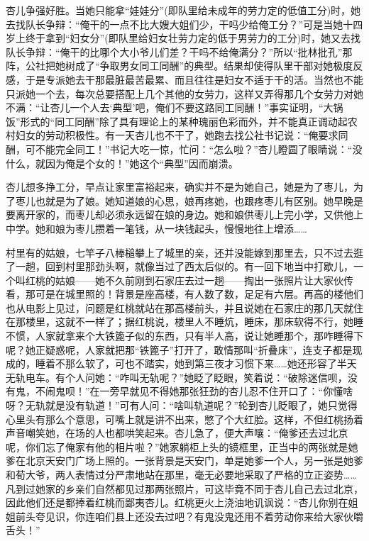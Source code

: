 \par 杏儿争强好胜。当她只能拿“娃娃分”(即队里给未成年的劳力定的低值工分)时，她去找队长争辩：“俺干的一点不比大嫂大姐们少，干吗少给俺工分？”可是当她十四岁上终于拿到“妇女分”(即队里给妇女壮劳力定的低于男劳力的工分)时，她又去找队长争辩：“俺干的比哪个大小爷儿们差？干吗不给俺满分？”所以“批林批孔”那阵，公社把她树成了“争取男女同工同酬”的典型。结果却使得队里干部对她极度反感，于是专派她去干那最脏最苦最累、而且往往是妇女不适于干的活。当然也不能只派她一个去，每次总要搭配上几个其他的女劳力，这样又弄得那几个女劳力对她不满：“让杏儿一个人去‘典型’吧，俺们不要这路同工同酬！”事实证明，“大锅饭”形式的“同工同酬”除了具有理论上的某种瑰丽色彩而外，并不能真正调动起农村妇女的劳动积极性。有一天杏儿也不干了，她跑去找公社书记说：“俺要求同酬，可不能完全同工！”书记大吃一惊，忙问：“怎么啦？”杏儿瞪圆了眼睛说：“没什么，就因为俺是个女的！”她这个“典型”因而崩溃。
\par 杏儿想多挣工分，早点让家里富裕起来，确实并不是为她自己，她是为了枣儿，为了枣儿也就是为了娘。她知道娘的心思，娘再疼她，也跟疼枣儿有区别。她早晚是要离开家的，而枣儿却必须永远留在娘的身边。她和娘供枣儿上完小学，又供他上中学。她和娘为枣儿攒着一笔钱，从一块钱起头，慢慢地往上增添……
\par 村里有的姑娘，七竿子八棒槌攀上了城里的亲，还并没能嫁到那里去，只不过去逛了一趟，回到村里那劲头啊，就像当过了西太后似的。有一回下地当中打歇儿，一个叫红桃的姑娘——她不久前刚到石家庄去过一趟——掏出一张照片让大家伙传看，那可是在城里照的！背景是座高楼，有人数了数，足足有六层。再高的楼他们也从电影上见过，问题是红桃就站在那高楼前头，并且说她在石家庄的那几天就住在那楼里，这就不一样了；据红桃说，楼里人不睡炕，睡床，那床软得不行，她睡不惯，人家就拿来个大铁篦子似的东西，只有半人高，说让她睡那个，那咋睡得下呢？她正疑惑呢，人家就把那“铁篦子”打开了，敢情那叫“折叠床”，连支子都是现成的，睡着不那么软了，可也不踏实，她到第三夜才习惯下来……她还形容了半天无轨电车。有个人问她：“咋叫无轨呢？”她眨了眨眼，笑着说：“破除迷信呗，没有鬼，不闹鬼呗！”在一旁早就见不得她那张狂劲的杏儿忍不住开口了：“你懂啥呀？无轨就是没有轨道！”可有人问：“啥叫轨道呢？”轮到杏儿眨眼了，她只觉得心里头有那么个意思，可嘴上就是讲不出来，憋了个大红脸。这样，不但红桃扬着声音嘲笑她，在场的人也都哄笑起来。杏儿急了，便大声嚷：“俺爹还去过北京呢，你们忘了俺家有他的相片啦？”她家躺柜上头的镜框里，正当中的两张就是她爹在北京天安门广场上照的。一张背景是天安门，单是她爹一个人，另一张是她爹和荀大爷，两人表情过分严肃地站在那里，毫无必要地采取了严格的立正姿势……凡到过她家的乡亲们自然都见过那两张照片，可这毕竟不同于杏儿自己去过北京，因此他们还是都捧着红桃而鄙夷杏儿。红桃更火上浇油地讥讽说：“杏儿你别在姐姐前头夸见识，你连咱们县上还没去过吧？有鬼没鬼还用不着劳动你来给大家伙嚼舌头！”
